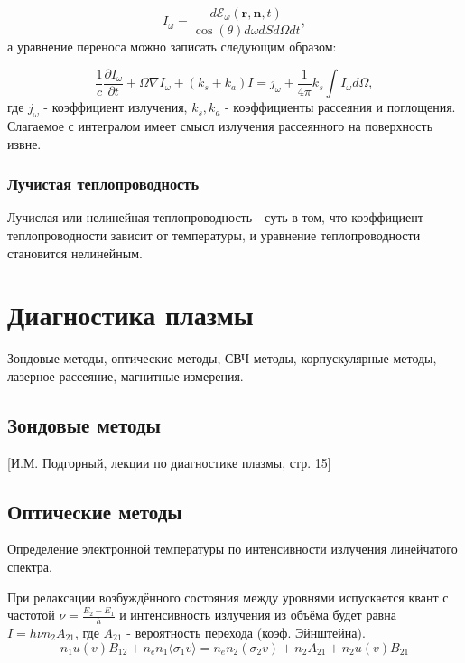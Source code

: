 \documentclass[10pt, a4paper]{article}
\let\stdsection\section
\renewcommand\section{\newpage\stdsection}
\begin{document}
\begin{equation}
    I_{\omega} = \frac{d\mathcal{E}_{\omega}(\mathbf{r},\mathbf{n},t)}{\cos(\theta)d\omega dSd\Omega dt},
\end{equation}
а уравнение переноса можно записать следующим образом:

\begin{equation}
    \frac{1}{c} \frac{\partial I_{\omega}}{\partial t} + \mathcal{\Omega}\nabla I_{\omega} + (k_s + k_a) I = j_{\omega} + \frac{1}{4\pi} k_s \int I_{\omega} d\Omega,
\end{equation}
где $j_{\omega}$ - коэффициент излучения, $k_s, k_a$ - коэффициенты рассеяния и поглощения. Слагаемое с интегралом имеет смысл излучения рассеянного на поверхность извне.

\subsubsection{Лучистая теплопроводность}

Лучислая или нелинейная теплопроводность - суть в том, что коэффициент теплопроводности зависит от температуры, и уравнение теплопроводности становится нелинейным.


\section{Диагностика плазмы}

Зондовые методы, оптические методы, СВЧ-методы, корпускулярные методы, лазерное рассеяние, магнитные измерения.

\subsection{Зондовые методы}

[И.М. Подгорный, лекции по диагностике плазмы, стр. 15]

\subsection{Оптические методы}

Определение электронной температуры по интенсивности излучения линейчатого спектра.

При релаксации возбуждённого состояния между уровнями испускается квант с частотой $\nu=\frac{E_2-E_1}{h}$ и интенсивность излучения из объёма будет равна $I=h\nu n_{2} A_{21}$, где $A_{21}$ - вероятность перехода (коэф. Эйнштейна).
\begin{equation}
	n_1 u(v)B_{12}+n_e n_1 \langle\sigma_1 v\rangle=n_e n_2 (\sigma_2 v) + n_2 A_{21}+n_2 u(v) B_{21}
\end{equation}
\end{document}
